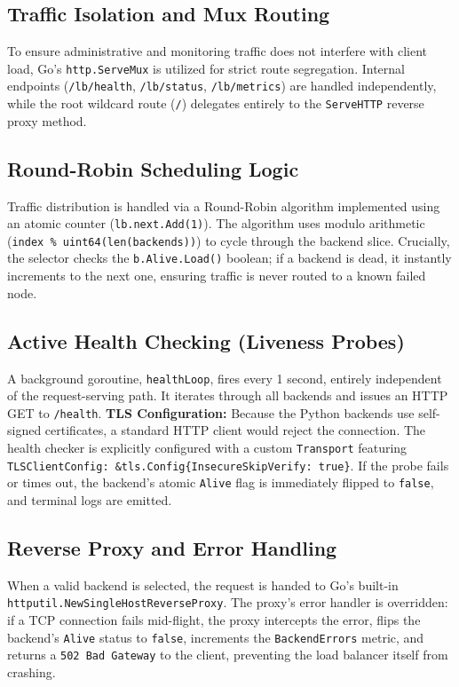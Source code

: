 \documentclass[12pt,a4paper]{article}
\begin{document}
\subsection{Traffic Isolation and Mux Routing}
To ensure administrative and monitoring traffic does not interfere with client load, Go's \texttt{http.ServeMux} is utilized for strict route segregation. Internal endpoints (\texttt{/lb/health}, \texttt{/lb/status}, \texttt{/lb/metrics}) are handled independently, while the root wildcard route (\texttt{/}) delegates entirely to the \texttt{ServeHTTP} reverse proxy method.

\subsection{Round-Robin Scheduling Logic}
Traffic distribution is handled via a Round-Robin algorithm implemented using an atomic counter (\texttt{lb.next.Add(1)}). The algorithm uses modulo arithmetic (\texttt{index \% uint64(len(backends))}) to cycle through the backend slice. Crucially, the selector checks the \texttt{b.Alive.Load()} boolean; if a backend is dead, it instantly increments to the next one, ensuring traffic is never routed to a known failed node.

\subsection{Active Health Checking (Liveness Probes)}
A background goroutine, \texttt{healthLoop}, fires every 1 second, entirely independent of the request-serving path. It iterates through all backends and issues an HTTP GET to \texttt{/health}. 
\textbf{TLS Configuration:} Because the Python backends use self-signed certificates, a standard HTTP client would reject the connection. The health checker is explicitly configured with a custom \texttt{Transport} featuring \texttt{TLSClientConfig: \&tls.Config\{InsecureSkipVerify: true\}}. If the probe fails or times out, the backend's atomic \texttt{Alive} flag is immediately flipped to \texttt{false}, and terminal logs are emitted.

\subsection{Reverse Proxy and Error Handling}
When a valid backend is selected, the request is handed to Go's built-in \texttt{httputil.NewSingleHostReverseProxy}. The proxy's error handler is overridden: if a TCP connection fails mid-flight, the proxy intercepts the error, flips the backend's \texttt{Alive} status to \texttt{false}, increments the \texttt{BackendErrors} metric, and returns a \texttt{502 Bad Gateway} to the client, preventing the load balancer itself from crashing.
\end{document}
